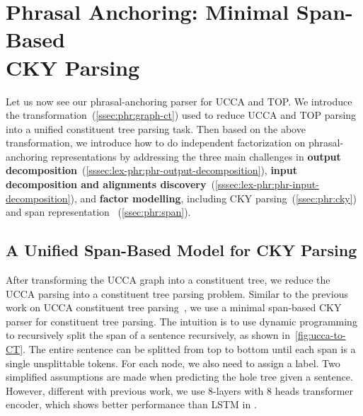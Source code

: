 \section[Phrasal Anchoring: Minimal Span-Based CKY Parsing]{Phrasal Anchoring: Minimal Span-Based \\CKY Parsing}
\label{sec:lex-phr:cky-based}

Let us now see our phrasal-anchoring parser for UCCA and TOP. We
introduce the transformation~(\autoref{ssec:phr:graph-ct}) used to
reduce UCCA and TOP parsing into a unified constituent tree parsing
task. Then based on the above transformation, we introduce how to do
independent factorization on phrasal-anchoring representations by addressing the three
main challenges in \textbf{output
  decomposition}~(\autoref{sssec:lex-phr:phr-output-decomposition}),
\textbf{input decomposition and alignments
  discovery}~(\autoref{sssec:lex-phr:phr-input-decomposition}), and
\textbf{factor modelling}, including CKY
parsing~(\autoref{ssec:phr:cky}) and span representation
~(\autoref{ssec:phr:span}).





\subsection{A Unified Span-Based Model for CKY Parsing}
\label{ssec:phr:cky}
After transforming the UCCA graph into a constituent tree, we reduce
the UCCA parsing into a constituent tree parsing problem. Similar to
the previous work on UCCA constituent tree
parsing~\cite{jiang2019hlt}, we use a minimal span-based CKY parser
for constituent tree parsing.  The intuition is to use dynamic
programming to recursively split the span of a sentence recursively,
as shown in~\autoref{fig:ucca-to-CT}. The entire sentence can be
splitted from top to bottom until each span is a single unsplittable
tokens. For each node, we also need to assign a label. Two simplified
assumptions are made when predicting the hole tree given a
sentence. However, different with previous work, we use 8-layers with
8 heads transformer encoder, which shows better performance than LSTM
in \citet{kitaev2018constituency}.

